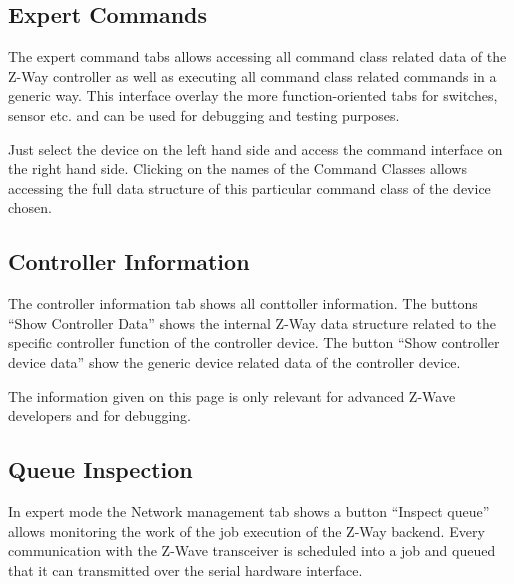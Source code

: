 \subsection{Expert Commands} 

The expert command tabs allows accessing all command class related data of the Z-Way controller as 
well as executing all command class related commands in a generic way. This interface overlay the
 more function-oriented tabs for switches, sensor etc. and can be used for debugging and testing purposes.

Just select the device on the left hand side and access the command interface on the right hand side. 
Clicking on the names of the Command Classes allows accessing the full data structure of this particular 
command class of the device chosen.

\subsection{Controller Information}

The controller information tab shows all conttoller information. The buttons “Show Controller Data” 
shows the internal Z-Way data structure related to the specific controller function of the controller 
device. The button “Show controller device data” show the generic device related data of the controller device.

The information given on this page is only relevant for advanced Z-Wave developers and for debugging.


\subsection{Queue Inspection}

In expert mode the Network management tab shows a button “Inspect queue” allows monitoring the work of the 
job execution of the Z-Way backend. Every communication with the Z-Wave transceiver is scheduled into a 
job and queued that it can transmitted over the serial hardware interface.

